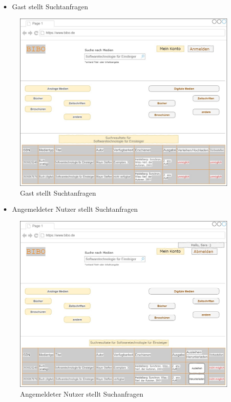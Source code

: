 \documentclass[12pt, a4paper]{article}
\begin{document}
\pagebreak
\begin{itemize}
	\item Gast stellt Suchtanfragen 
\end{itemize}
\begin{figure}[h]
	\includegraphics[width=\textwidth]{GUIs/such_Gast.jpg}
	\caption{Gast stellt Suchtanfragen}
	\label{fig:suchtanfragen_gast}
\end{figure}
\pagebreak
\begin{itemize}
	\item Angemeldeter Nutzer stellt Suchtanfragen 
\end{itemize}
\begin{figure}[h]
	\includegraphics[width=\textwidth]{GUIs/such_angemNutzer.jpg}
	\caption{Angemeldeter Nutzer stellt Suchanfragen}
	\label{fig:suchtanfragen_angem_nutzer}
\end{figure}
\end{document}
